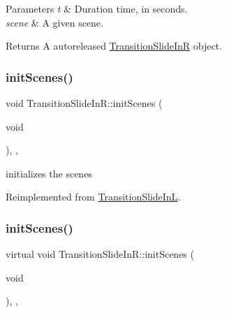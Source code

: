 \begin{DoxyParams}{Parameters}
{\em t} & Duration time, in seconds. \\
\hline
{\em scene} & A given scene. \\
\hline
\end{DoxyParams}
\begin{DoxyReturn}{Returns}
A autoreleased \hyperlink{classTransitionSlideInR}{Transition\+Slide\+InR} object. 
\end{DoxyReturn}
\mbox{\label{classTransitionSlideInR_a7fde5b3340ce2bd108d6382e0fd1a44f}} 
\subsubsection{\texorpdfstring{init\+Scenes()}{initScenes()}\hspace{0.1cm}{\footnotesize\ttfamily [1/2]}}
{\footnotesize\ttfamily void Transition\+Slide\+In\+R\+::init\+Scenes (\begin{DoxyParamCaption}\item[{void}]{ }\end{DoxyParamCaption})\hspace{0.3cm}{\ttfamily [override]}, {\ttfamily [protected]}, {\ttfamily [virtual]}}

initializes the scenes 

Reimplemented from \hyperlink{classTransitionSlideInL_abac332ac289d8ed399168d7a428be3b7}{Transition\+Slide\+InL}.

\mbox{\label{classTransitionSlideInR_a52d4ea6804532c5e6bc36400f6e907a6}} 
\subsubsection{\texorpdfstring{init\+Scenes()}{initScenes()}\hspace{0.1cm}{\footnotesize\ttfamily [2/2]}}
{\footnotesize\ttfamily virtual void Transition\+Slide\+In\+R\+::init\+Scenes (\begin{DoxyParamCaption}\item[{void}]{ }\end{DoxyParamCaption})\hspace{0.3cm}{\ttfamily [override]}, {\ttfamily [protected]}, {\ttfamily [virtual]}}

